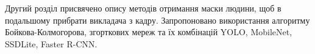 Другий розділ присвячено опису методів отримання маски людини, 
щоб в подальшому прибрати викладача з кадру. Запропоновано використання
алгоритму Бойкова-Колмогорова, згорткових мереж та їх комбінацій
YOLO, MobileNet, SSDLite, Faster R-CNN.